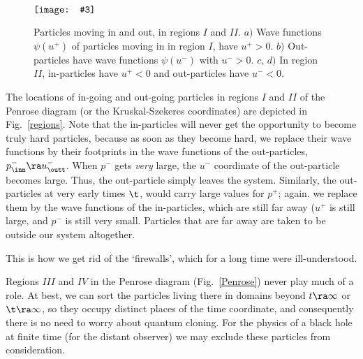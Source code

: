 \documentclass[12pt]{article}
\def\lowerwidthfig#1#2#3{\(\raise-#1\hbox{\texttt{[image: \#3]}}\)}
\begin{document}
\begin{figure} [h]\qqquad\quad
\lowerwidthfig{0pt}{320pt}{inoutregions.eps} \quad \begin{caption}
{ \small Particles moving in and out, in regions \(I\) and \(II\). $a)$ Wave functions \(\psi(u^+)\) of particles moving in in region \(I\), have \(u^+>0\). $b)$ Out-particles have wave functions \(\psi(u^-)\) with \(u^->0\). $c,\,d)$ In region \(II\), in-particles have \(u^+<0\) and out-particles have \(u^-<0\).
 }
 \end{caption} \end{figure}

The locations of in-going and out-going particles in regions \(I\) and \(II\) of the Penrose diagram (or the Kruskal-Szekeres coordinates) are depicted in Fig.~\ref{regions}. Note that the in-particles will never get the opportunity to become truly hard particles, because as soon as they become hard, we replace their wave functions by their footprints in the wave functions of the out-particles, \(p^-_\inn\ra u^-_\outt\). When \(p^-\) gets \emph{very} large, the \(u^-\) coordinate of the out-particle becomes large. Thus, the out-particle simply leaves the system. Similarly, the out-particles at very early times \(\t\), would carry large values for \(p^+\); again. we replace them by the wave functions of the in-particles, which are still far away (\(u^+\) is still large, and \(p^-\) is still very small. Particles that are far away are taken to be outside our system altogether.

This is how we get rid of the `firewalls', which for a long time were ill-understood.\cite{firewall}

Regions \(III\) and \(IV\) in the Penrose diagram (Fig.~\ref{Penrose}) never play much of a role. At best, we can sort the particles living there in domains beyond \(t\ra\infty\) or \(\t\ra\-\infty\), so they occupy distinct places of the time coordinate, and consequently there is no need to worry about quantum cloning. For the physics of a black hole at finite time (for the distant observer) we may exclude these particles from consideration.
\end{document}
